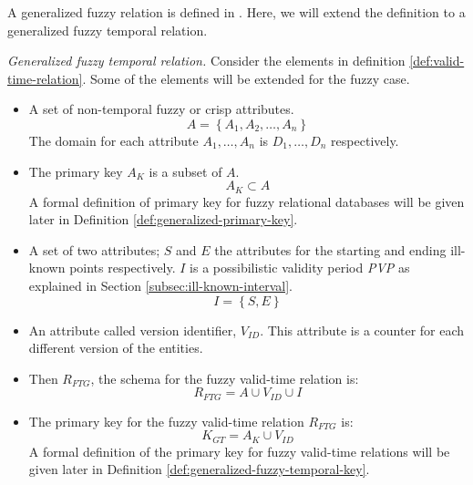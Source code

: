 A generalized fuzzy relation is defined in \cite{Medina1994}. Here, we will extend the definition to a generalized fuzzy temporal relation.

\begin{definition}
\emph{Generalized fuzzy temporal relation.}
\label{def:fuzzy-temporal-relation}
Consider the elements in definition \ref{def:valid-time-relation}. Some of the elements will be extended for the fuzzy case.

\begin{itemize}
 \item A set of non-temporal fuzzy  or crisp attributes.
	\begin{equation}
	\label{eq:fuzzy-attribute-set}
	A = \left \lbrace A_1, A_2, \ldots, A_n \right \rbrace
	\end{equation}
      The domain for each attribute $A_1, \ldots, A_n$ is $D_1, \ldots, D_n$ respectively. 
\item The primary key $A_K$ is a subset of $A$.
      \begin{equation}
       \label{eq:fuzzy-primary-key-a}
      A_K \subset A
      \end{equation}
A formal definition of primary key for fuzzy relational databases will be given later in Definition \ref{def:generalized-primary-key}.
\item A set of two attributes; $S$  and $E$ the attributes for the starting and ending ill-known points respectively. $I$ is a possibilistic validity period \emph{PVP} as explained in Section \ref{subsec:ill-known-interval}.
\begin{equation}
 \label{eq:fuzzy-attribute-time-interval}
I = \left \lbrace S, E \right \rbrace
\end{equation}
\item An attribute called version identifier, $V_{ID}$. This attribute is a counter for each different version of the entities. 



\item Then $R_{FTG}$, the schema for the fuzzy valid-time relation is:
\begin{equation}
 \label{eq:fuzzy-valid-time-relation}
R_{FTG} = A \cup V_{ID} \cup  I
\end{equation}
\item The primary key for the fuzzy valid-time relation $R_{FTG}$ is:
\begin{equation}
 \label{eq:fuzzy-valid-time-temporal-pk}
K_{GT} = A_K \cup V_{ID}
\end{equation}
A formal definition of the primary key for fuzzy valid-time relations will be given later in Definition \ref{def:generalized-fuzzy-temporal-key}.



\end{itemize}
\end{definition}
